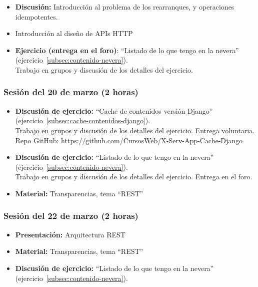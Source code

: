 \documentclass[a4paper,12pt]{article}
\begin{document}
\begin{itemize}
\item \textbf{Discusión:} Introducción al problema de los rearranques, y operaciones idempotentes.
\item Introducción al diseño de APIs HTTP
\item \textbf{Ejercicio (entrega en el foro)}: ``Listado de lo que tengo en la nevera'' (ejercicio~\ref{subsec:contenido-nevera}). \\
  Trabajo en grupos y discusión de los detalles del ejercicio.
\end{itemize}

\subsubsection{Sesión del 20 de marzo (2 horas)}

\begin{itemize}
\item \textbf{Discusión de ejercicio:} ``Cache de contenidos versión Django'' (ejercicio~\ref{subsec:cache-contenidos-django}). \\
  Trabajo en grupos y discusión de los detalles del ejercicio.
   Entrega voluntaria. \\
   Repo GitHub: \url{https://github.com/CursosWeb/X-Serv-App-Cache-Django}
\item \textbf{Discusión de ejercicio:} ``Listado de lo que tengo en la nevera'' (ejercicio~\ref{subsec:contenido-nevera}). \\
  Trabajo en grupos y discusión de los detalles del ejercicio.
  Entrega en el foro.
\item \textbf{Material:} Transparencias, tema ``REST''
\end{itemize}

\subsubsection{Sesión del 22 de marzo (2 horas)}

\begin{itemize}
\item \textbf{Presentación:} Arquitectura REST
\item \textbf{Material:} Transparencias, tema ``REST''
\item \textbf{Discusión de ejercicio:} ``Listado de lo que tengo en la nevera'' (ejercicio~\ref{subsec:contenido-nevera}).
\end{itemize}
\end{document}
